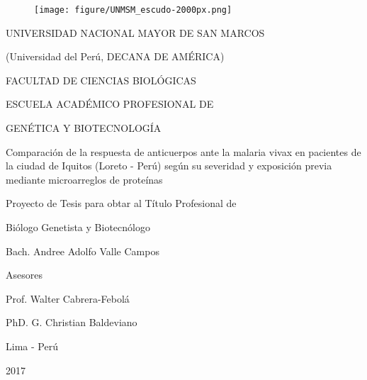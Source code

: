 \documentclass[]{article}
\title{}
\author{}
\date{}
\begin{document}
\renewcommand{\contentsname}{Índice General} 
\renewcommand{\tablename}{Tabla}
\renewcommand{\tableautorefname}{Tabla}


\clearpage
{} \vspace*{\fill}

\begin{centering}

\begin{figure}[!ht]
  \begin{center}
    \texttt{[image: figure/UNMSM\_escudo-2000px.png]}
  \end{center}
\end{figure}

\Large
UNIVERSIDAD NACIONAL MAYOR DE SAN MARCOS

\large
(Universidad del Perú, DECANA DE AMÉRICA)

\vspace{.5 cm}

\Large
FACULTAD DE CIENCIAS BIOLÓGICAS

\vspace{.5 cm}

\normalsize
ESCUELA ACADÉMICO PROFESIONAL DE

GENÉTICA Y BIOTECNOLOGÍA

\vspace{1.5 cm}

\Large
Comparación de la respuesta de anticuerpos ante la %
malaria vivax 
en pacientes de la ciudad de Iquitos (Loreto - Perú)
según su severidad y exposición previa
mediante microarreglos de proteínas

\vspace{1.5 cm}

\Large
Proyecto de Tesis para obtar al Título Profesional de 

Biólogo Genetista y Biotecnólogo

\vspace{1 cm}

\Large
Bach. Andree Adolfo Valle Campos

\vspace{1 cm}

\Large
Asesores

Prof. Walter Cabrera-Febolá

PhD. G. Christian Baldeviano


\vspace{1 cm}

Lima - Perú

\vspace{.5 cm}

2017

\end{centering}
\end{document}
